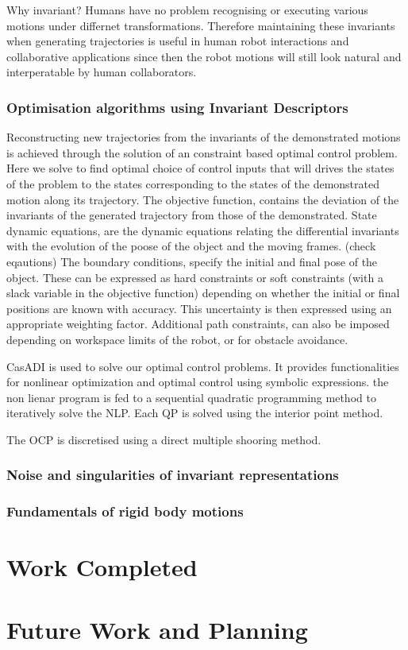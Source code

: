 \documentclass{article}
\begin{document}
Why invariant?
Humans have no problem recognising or executing various motions under differnet transformations. Therefore maintaining these invariants when generating trajectories is useful in human robot interactions and collaborative applications since then the robot motions will still look natural and interperatable by human collaborators. 

\subsubsection{Optimisation algorithms using Invariant Descriptors}
Reconstructing new trajectories from the invariants of the demonstrated motions is achieved through the solution of an constraint based optimal control problem. Here we solve to find optimal choice of control inputs that will drives the states of the problem to the states corresponding to the states of the demonstrated motion along its trajectory. 
The objective function, contains the deviation of the invariants of the generated trajectory from those of the demonstrated. 
State dynamic equations, are the dynamic equations relating the differential invariants with the evolution of the poose of the object and the moving frames. (check eqautions) 
The boundary conditions, specify the initial and final pose of the object. These can be expressed as hard constraints or soft constraints (with a slack variable in the objective function) depending on whether the initial or final positions are known with accuracy. This uncertainty is then expressed using an appropriate weighting factor. 
Additional path constraints, can also be imposed depending on workspace limits of the robot, or for obstacle avoidance.

CasADI is used to solve our optimal control problems. It provides functionalities for nonlinear optimization  and optimal control using symbolic expressions. the non lienar program is fed to a sequential quadratic programming method to iteratively solve the NLP. Each QP is solved using the interior point method. 

The OCP is discretised using a direct multiple shooring method. 

\subsubsection{Noise and singularities of invariant representations}
\subsubsection{Fundamentals of rigid body motions}

\section{Work Completed}

\section{Future Work and Planning}
 
\end{document}
